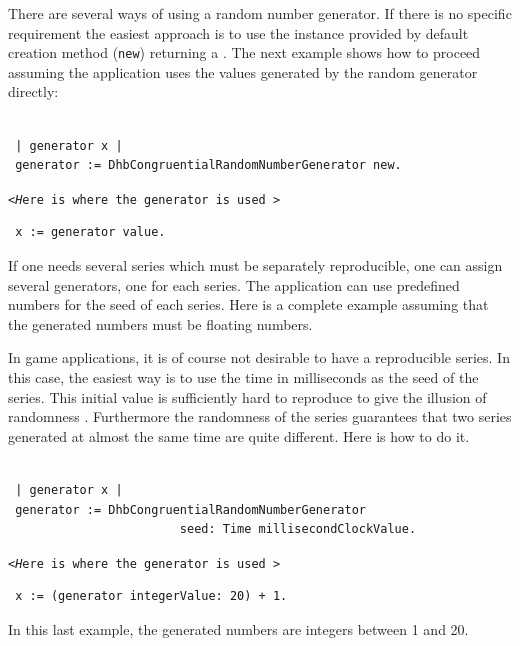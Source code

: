 There are several ways of using a random number generator. If
there is no specific requirement the easiest approach is to use
the instance provided by default creation method ({\tt new})
returning a . The next example shows how to
proceed assuming the application uses the values generated by the
random generator directly:
\begin{codeExample}
\label{codex:crgdefault}
\begin{verbatim}

 | generator x |
 generator := DhbCongruentialRandomNumberGenerator new.
\end{verbatim}
\hfil{\tt <\textsl Here is where the generator is used\tt
>}\hfil
\begin{verbatim}
 x := generator value.
\end{verbatim}
\end{codeExample}
If one needs several series which must be separately reproducible,
one can assign several generators, one for each series. The
application can use predefined numbers for the seed of each
series. Here is a complete example assuming that the generated
numbers must be floating numbers.

In game applications, it is of course not desirable to have a
reproducible series. In this case, the easiest way is to use the
time in milliseconds as the seed of the series. This initial value
is sufficiently hard to reproduce to give the illusion of
randomness . Furthermore the randomness of the series guarantees
that two series generated at almost the same time are quite
different. Here is how to do it.
\begin{codeExample}
\begin{verbatim}

 | generator x |
 generator := DhbCongruentialRandomNumberGenerator
                        seed: Time millisecondClockValue.
\end{verbatim}
\hfil{\tt <\textsl Here is where the generator is used\tt
>}\hfil
\begin{verbatim}
 x := (generator integerValue: 20) + 1.
\end{verbatim}
\end{codeExample}
In this last example, the generated numbers are integers between 1
and 20.

